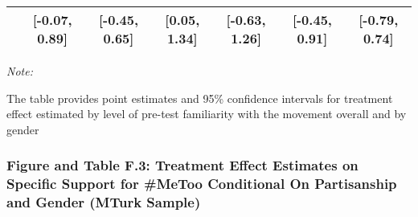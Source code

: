 \documentclass[
]{article}
\begin{document}
\begin{table}[H]
\begin{threeparttable}
\begin{tabular}[t]{lcccccc}
\hspace{1em} & {}[-0.07, 0.89] & {}[-0.45, 0.65] & {}[0.05, 1.34] & {}[-0.63, 1.26] & {}[-0.45, 0.91] & {}[-0.79, 0.74]\\
\bottomrule
\end{tabular}
\begin{tablenotes}
\small
\item \textit{Note: } 
\item The table provides point estimates and 95\% confidence intervals for treatment effect estimated by level of pre-test familiarity with the movement overall and by gender
\end{tablenotes}
\end{threeparttable}
\end{table}

\hypertarget{figure-and-table-f.3-treatment-effect-estimates-on-specific-support-for-metoo-conditional-on-partisanship-and-gender-mturk-sample}{%
\subsubsection{Figure and Table F.3: Treatment Effect Estimates on
Specific Support for \#MeToo Conditional On Partisanship and Gender
(MTurk
Sample)}\label{figure-and-table-f.3-treatment-effect-estimates-on-specific-support-for-metoo-conditional-on-partisanship-and-gender-mturk-sample}}
\end{document}
